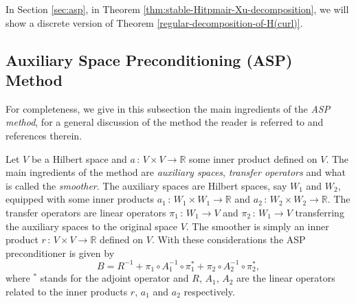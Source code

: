 In Section \ref{sec:asp}, in Theorem \ref{thm:stable-Hitpmair-Xu-decomposition}, we will show a discrete version of Theorem \ref{regular-decomposition-of-H(curl)}.
 
\subsection{Auxiliary Space Preconditioning (ASP) Method}\label{subsec:Auxiliary-Space-Preconditioning-Method}
For completeness, we give in this subsection the main ingredients of the {\em ASP method}, for a general discussion of the method the reader is referred to \cite{chen2015auxiliary,hiptmair2006auxiliary,hiptmair2007nodal,kolev2008auxiliary,kolev2009parallel,nepomnyaschikh1991decomposition,xu1992iterative} and references therein. 

Let $V$ be a Hilbert space and $a\,:\, V \times V \longrightarrow \mathbb{R}$ some inner product defined on $V$. The main ingredients of the method are {\em auxiliary spaces}, {\em transfer operators} and what is called the {\em smoother}. The auxiliary spaces are Hilbert spaces, say $W_1$ and $W_2$, equipped  with some inner products ${a}_1 \,:\, W_1 \times W_1 \longrightarrow \mathbb{R}$ and ${a}_2 \,:\, W_2 \times W_2 \longrightarrow  \mathbb{R}$. The transfer operators are linear operators $\pi_1\,:\, W_1 \longrightarrow V$ and $\pi_2 \,:\, W_1 \longrightarrow V$ transferring the auxiliary spaces to the original space $V$. The smoother is simply an inner product $r\,:\, V \times V \longrightarrow \mathbb{R}$ defined on $V$. With these considerations the ASP preconditioner is given by
\begin{equation*}\label{eq:ASP-preconditione}
B=R^{-1} + \pi_1 \circ {A}_1^{-1} \circ \pi_1^*+\pi_2 \circ {A}_2^{-1} \circ \pi_2^*,
\end{equation*} 
where $^*$ stands for the adjoint operator and $R$, $A_1$, $A_2$ are the linear operators related to the inner products $r$, $a_1$ and $a_2$ respectively. 

